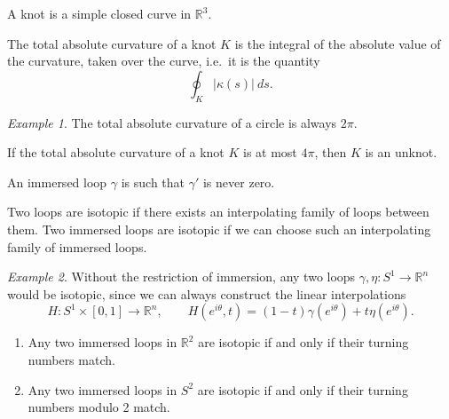 \documentclass[11pt]{article}
\newcommand{\R}{\mathbb{R}}
\theoremstyle{definition}
\theoremstyle{remark}
\newtheorem*{example}{Example}
\numberwithin{equation}{section}
\begin{document}
    \begin{definition}
        A knot is a simple closed curve in $\R^3$.
    \end{definition}

    \begin{definition}
        The total absolute curvature of a knot $K$ is the integral of the absolute
        value of the curvature, taken over the curve, i.e.\ it is the quantity \[
            \oint_K |\kappa(s)|\:ds.
        \] 
    \end{definition}
    \begin{example}
        The total absolute curvature of a circle is always $2\pi$.
    \end{example}

    \begin{theorem}
        If the total absolute curvature of a knot $K$ is at most $4\pi$, then $K$ is
        an unknot.
    \end{theorem}

    \begin{definition}
        An immersed loop $\gamma$ is such that $\gamma'$ is never zero.
    \end{definition}

    \begin{definition}
        Two loops are isotopic if there exists an interpolating family of loops
        between them. Two immersed loops are isotopic if we can choose such an
        interpolating family of immersed loops.
    \end{definition}
    \begin{example}
        Without the restriction of immersion, any two loops $\gamma, \eta\colon S^1
        \to \R^n$ would be isotopic, since we can always construct the linear
        interpolations \[
            H\colon S^1 \times [0, 1] \to \R^n, \qquad H(e^{i\theta}, t) = (1 -
            t)\gamma(e^{i\theta}) + t\eta(e^{i\theta}).
        \] 
    \end{example}

    \begin{theorem}
        \mbox{}
        \begin{enumerate}
            \itemsep0em
            \item Any two immersed loops in $\R^2$ are isotopic if and only if their
            turning numbers match.
            \item Any two immersed loops in $S^2$ are isotopic if and only if their
            turning numbers modulo 2 match.
        \end{enumerate}
    \end{theorem}
\end{document}
